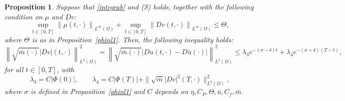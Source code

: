 \documentclass[10pt,a4paper,nouppercase,nowrite]{article}
\numberwithin{equation}{section}
\newcommand{\Sp}{{\textsc (S)} }
\newtheorem{prop}[defn]{Proposition}
\theoremstyle{definition}
\begin{document}
	\begin{prop}
		Suppose that \eqref{integrab} and \Sp holds, together with the following condition on $\mu$ and $Dv$:
		\begin{equation*}
			\sup_{t \in [0,T]} \left \| \mu(t,\cdot) \right \|_{L^\infty(\Omega)} + \sup_{t \in [0,T]} \left \| Dv(t,\cdot) \right \|_{L^\infty(\Omega)} \le \Theta,
		\end{equation*}
		where $\Theta$ is as in Proposition~\ref{phinl1}.
		Then, the following inequality holds:
		\begin{equation*}
			\left \| \sqrt{\bar{m}(\cdot)} |Dv|(t,\cdot) \right \|^2_{L^2(\Omega)} = \left \|\sqrt{\bar{m}(\cdot)} |Du(t,\cdot)-D\bar{u}(\cdot)| \right \|^2_{L^2(\Omega)} \le \lambda_3 e^{-(\sigma-\delta) t} + \lambda_4 e^{-(\sigma+\delta) (T-t)},
		\end{equation*}
		for all $t \in [0,T]$, with
		$$\lambda_3=C|\Phi(0)|, \qquad \lambda_4=C |\Phi(T)| + \| \sqrt{\bar{m}}|Dv|^2(T,\cdot)\|^2_{L^2(\Omega)},$$
		where $\sigma$ is defined in Proposition~\ref{phinl1} and $C$ depends on $\eta, C_P, \Theta,\bar{u},C_f,\bar{m}$.
		\label{L2Dv}
	\end{prop}
\end{document}
